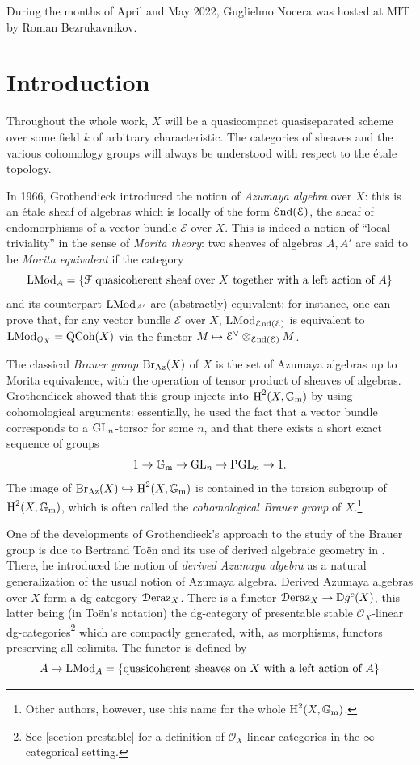 \documentclass[11pt, twoside]{article} %
\numberwithin{equation}{section}
\theoremstyle{plain}
\theoremstyle{definition}
\newcommand{\Gm}{\mathbb G_{\mathrm{m}}}
\newcommand{\QCoh}{\textup{QCoh}}
\newcommand{\LMod}{\textup{LMod}}
\newcommand{\tH}{\textup{H}}
\newcommand{\cE}{\mathcal{E}}
\newcommand{\cO}{{\mathcal O}}
\newcommand{\cF}{{\mathcal F}}
\newcommand{\cEnd}{{\mathcal{E}\textup{nd}}}
\newcommand{\GL}{{\textup{GL}}}
\newcommand{\PGL}{{\textup{PGL}}}
\newcommand{\Deraz}{\mathcal D\textup{eraz}}
\begin{document}
 During the months of April and May 2022, Guglielmo Nocera was hosted at MIT by Roman Bezrukavnikov.



	\section{Introduction}\label{section-history}
	Throughout the whole work, $X$ will be a quasicompact quasiseparated scheme over some field $k$ of arbitrary characteristic. The categories of sheaves and the various cohomology groups will always be understood with respect to the \'etale topology.
	
	In 1966, Grothendieck \cite{Grothendieck-Brauer-I} introduced the notion of \textit{Azumaya algebra} over $X$: this is an \'etale sheaf of algebras which is locally of the form $\cEnd(\cE)$, the sheaf of endomorphisms of a vector bundle $\cE$ over $X$. This is indeed a notion of ``local triviality'' in the sense of \textit{Morita theory}: two sheaves of algebras $A,A'$ are said to be \textit{Morita equivalent} if the category $$\LMod_{A}=\{\cF\textup{ quasicoherent sheaf over }X\textup{ together with a left action of }A\}$$ and its counterpart $\LMod_{A'}$ are (abstractly) equivalent: for instance, one can prove that, for any vector bundle $\cE$ over $X$, $\LMod_{\cEnd(\cE)}$ is equivalent to $\LMod_{\cO_X}=\QCoh(X)$ via the functor $M \mapsto \cE^{\vee}\otimes_{\cEnd(\cE)}M$.
	
	
	The classical \textit{Brauer group} $\textup{Br}_{\textup{Az}}(X)$ of $X$ is the set of Azumaya algebras up to Morita equivalence, with the operation of tensor product of sheaves of algebras. Grothendieck showed that this group injects into $\tH^2(X,\Gm)$ by using cohomological arguments: essentially, he used the fact that a vector bundle corresponds to a $\GL_n$-torsor for some $n$, and that there exists a short exact sequence of groups
	$$1\to \Gm\to \GL_n\to \PGL_n\to 1.$$
	The image of $\textup{Br}_{\textup{Az}}(X)\hookrightarrow\tH^2(X,\Gm)$ is contained in the torsion subgroup of $\tH^2(X,\Gm)$, which is often called the \textit{cohomological Brauer group} of $X$.\footnote{Other authors, however, use this name for the whole $\tH^2(X,\Gm)$.}
	
	One of the developments of Grothendieck's approach to the study of the Brauer group is due to Bertrand To\"en and its use of derived algebraic geometry in \cite{Toen-Azumaya}. There, he introduced the notion of \textit{derived Azumaya algebra} as a natural generalization of the usual notion of Azumaya algebra. Derived Azumaya algebras over $X$ form a dg-category $\Deraz_X$. There is a functor $\Deraz_X\to \mathbb{D}g^c(X)$, this latter being (in To\"en's notation) the dg-category of presentable stable $\cO_X$-linear dg-categories\footnote{See \cref{section-prestable} for a definition of $\cO_X$-linear categories in the $\infty$-categorical setting.} which are compactly generated, with, as morphisms, functors preserving all colimits. The functor is defined by $$A\mapsto \LMod_A=\{\textup{quasicoherent sheaves on $X$ with a left action of $A$}\}$$
 
\end{document}
